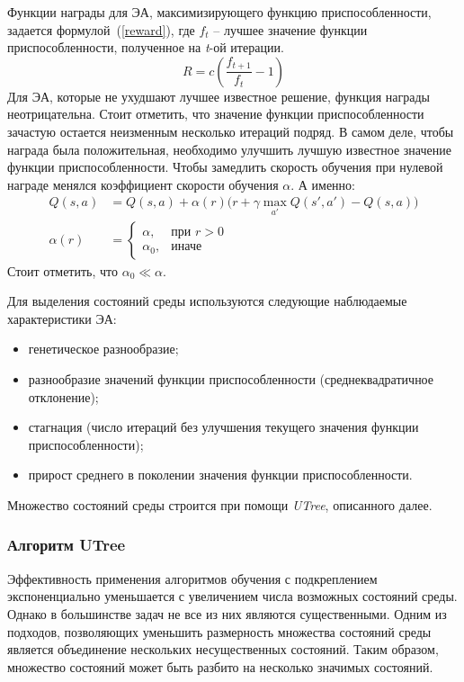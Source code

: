 Функции награды для ЭА, максимизирующего функцию приспособленности, задается формулой~(\ref{reward}), где $f_t$ -- лучшее значение функции приспособленности, полученное на \textit{t}-ой итерации.
\begin{equation}
\label{reward}
R = c(\frac{f_{t+1}}{f_t} - 1)
\end{equation}
Для ЭА, которые не ухудшают лучшее известное решение, функция награды неотрицательна. Стоит отметить, что значение функции приспособленности зачастую остается неизменным несколько итераций подряд. В самом деле, чтобы награда была положительная, необходимо улучшить лучшую известное значение функции приспособленности. Чтобы замедлить скорость обучения при нулевой награде менялся коэффициент скорости обучения $\alpha$. А именно:
\begin{align*}
Q(s,a) &= Q(s,a) + \alpha(r)(r + \gamma \max_{a'}{Q(s',a') - Q(s, a))} \\
\alpha(r) &= \begin{cases}\alpha, &\text{при } r > 0 \\ \alpha_0, &\text{иначе} \end{cases}
\end{align*}
Стоит отметить, что $\alpha_0 \ll \alpha$.

Для выделения состояний среды используются следующие наблюдаемые характеристики ЭА:
\begin{itemize}
    \item генетическое разнообразие;
    \item разнообразие значений функции приспособленности (среднеквадратичное отклонение);
    \item стагнация (число итераций без улучшения текущего значения функции приспособленности);
    \item прирост среднего в поколении значения функции приспособленности.
\end{itemize}

Множество состояний среды строится при помощи \textit{UTree}, описанного далее. 

\subsubsection{Алгоритм UTree}
\label{utree}
Эффективность применения алгоритмов обучения с подкреплением экспоненциально уменьшается с увеличением числа возможных состояний среды. Однако в большинстве задач не все из них являются существенными. Одним из подходов, позволяющих уменьшить размерность множества состояний среды является объединение нескольких несущественных состояний. Таким образом, множество состояний может быть разбито на несколько значимых состояний. 

